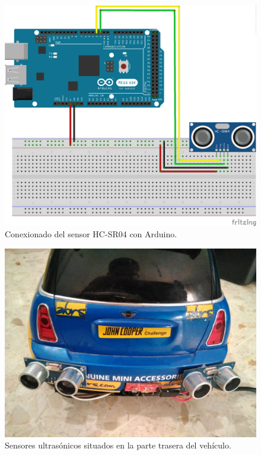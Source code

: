 \begin{figure}[H]
  \begin{center}
    \includegraphics[scale=0.5]{imagenes/conexionado_ultrasonido.png}
  \end{center}
  \caption{Conexionado del sensor HC-SR04 con Arduino.}
  \label{figura:sensor_HC-SR04_conexionado}
\end{figure}


 \begin{figure}[H]
  \begin{center}
    \includegraphics[scale=0.2]{imagenes/robot/ultrasonido_instalado.jpg}
  \end{center}
  \caption{Sensores ultrasónicos situados en la parte trasera del vehículo.}
  \label{figura:sensor_mq_2_potenciometro}
\end{figure}

